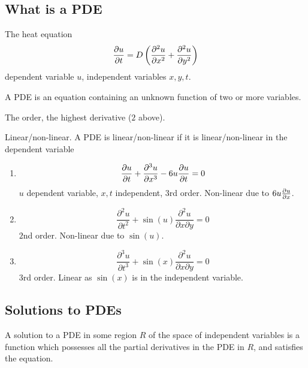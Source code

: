 \documentclass[10pt, a4paper]{article}
\begin{document}
\subsection{What is a PDE}

The heat equation
\[
\pd[u]{t} = D\left(\frac{\partial ^ 2u}{\partial x ^ 2} + \frac{\partial ^ 2u}{\partial y ^ 2}\right)
\]
dependent variable $u$,
independent variables $x, y, t$.

\begin{definition}
    A PDE is an equation containing an unknown function of two or more variables.
\end{definition}

\begin{definition}
    The order,
    the highest derivative
    ($2$ above).
\end{definition}

\begin{definition}
    Linear/non-linear.
    A PDE is linear/non-linear if it is linear/non-linear in the dependent variable
\end{definition}

\begin{example}
    \begin{enumerate}[label = \alph*)]
        \item
        \[
        \pd[u]{t} + \frac{\partial ^ 3u}{\partial x ^ 3} - 6u\pd[u]{t} = 0
        \]
        $u$ dependent variable,
        $x, t$ independent,
        $3$rd order.
        Non-linear due to $6u\pd[u]{x}$.

        \item
        \[
        \frac{\partial ^ 2u}{\partial t ^ 2} + \sin(u)\frac{\partial ^ 2u}{\partial x\partial y} = 0
        \]
        $2$nd order.
        Non-linear due to $\sin(u)$.

        \item
        \[
        \frac{\partial ^ 3u}{\partial t ^ 3} + \sin(x)\frac{\partial ^ 2u}{\partial x\partial y} = 0
        \]
        $3$rd order.
        Linear as $\sin(x)$ is in the independent variable.
    \end{enumerate}
\end{example}

\subsection{Solutions to PDEs}

\begin{definition}
    A solution to a PDE in some region $R$ of the space of independent variables is a function which possesses all the partial derivatives in the PDE in $R$,
    and satisfies the equation.
\end{definition}
\end{document}
